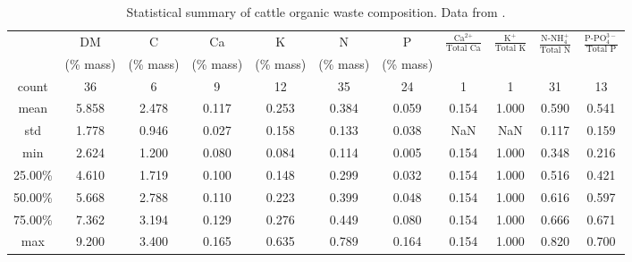 \documentclass[10pt,a4paper]{article}
\begin{document}
\begin{table}
	\centering
	\caption{Statistical summary of cattle organic waste composition. Data from \protect{}.} \label{table:dig_compt_stats}
	\begin{tabular}{ c c c c c c c c c c c}
		\toprule
		&DM		&C		&Ca		&K		&N		&P		&\multirow{2}{*}{\Large{$\frac{\text{Ca}^{\text{2+}}}{\text{Total Ca}}$}}	&\multirow{2}{*}{\Large{$\frac{\text{K}^{\text{+}}}{\text{Total K}}$}}	&\multirow{2}{*}{\Large{$\frac{\text{N-NH}^{+}_{4}}{\text{Total N}}$}}	&\multirow{2}{*}{\Large{$\frac{\text{P-PO}^{3-}_{4}}{\text{Total P}}$}}	\\	
		&(\% mass)		&(\% mass)		&(\% mass)		&(\% mass)		&(\% mass)		&(\% mass)		&	&	&	&	\\ \midrule
		count		&36		&6		&9		&12		&35		&24		&1			&1		&31			&13			\\ 
		mean		&5.858	&2.478	&0.117	&0.253	&0.384	&0.059	&0.154		&1.000	&0.590		&0.541		\\ 
		std		&1.778	&0.946	&0.027	&0.158	&0.133	&0.038	&NaN		&NaN	&0.117		&0.159		\\ 
		min		&2.624	&1.200	&0.080	&0.084	&0.114	&0.005	&0.154		&1.000	&0.348		&0.216		\\ 
		25.00\%	&4.610	&1.719	&0.100	&0.148	&0.299	&0.032	&0.154		&1.000	&0.516		&0.421		\\ 
		50.00\%	&5.668	&2.788	&0.110	&0.223	&0.399	&0.048	&0.154		&1.000	&0.616		&0.597		\\ 
		75.00\%	&7.362	&3.194	&0.129	&0.276	&0.449	&0.080	&0.154		&1.000	&0.666		&0.671		\\ 
		max		&9.200	&3.400	&0.165	&0.635	&0.789	&0.164	&0.154		&1.000	&0.820		&0.700		\\ \bottomrule
	\end{tabular}
\end{table}
\end{document}

